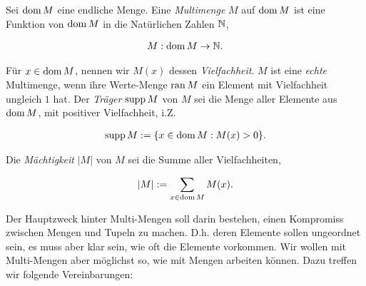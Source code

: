             \begin{definition}

                Sei $\operatorname{dom} M$ eine endliche Menge.
                Eine \textit{Multimenge} $M$ auf $\operatorname{dom} M$ ist eine Funktion von $\operatorname{dom} M$ in die Natürlichen Zahlen $\mathbb N$,

                \begin{align*}
                    M: \operatorname{dom} M \to \mathbb N.
                \end{align*}

                Für $x \in \operatorname{dom} M$, nennen wir $M(x)$ dessen \textit{Vielfachheit}.
                $M$ ist eine \textit{echte} Multimenge, wenn ihre Werte-Menge $\operatorname{ran} M$ ein Element mit Vielfachheit ungleich $1$ hat.
                Der \textit{Träger} $\operatorname{supp} M$ von $M$ sei die Menge aller Elemente aus $\operatorname{dom} M$, mit positiver Vielfachheit, i.Z.
                
                \begin{align*}
                    \operatorname{supp} M
                    :=
                    {\left \{ x \in \operatorname{dom} M: M(x) > 0 \right \}}.
                \end{align*}

                Die \textit{Mächtigkeit} $|M|$ von $M$ sei die Summe aller Vielfachheiten,

                \begin{align*}
                    |M| := \sum_{x \in \operatorname{dom} M} M(x).
                \end{align*}

            \end{definition}

            Der Hauptzweck hinter Multi-Mengen soll darin bestehen, einen Kompromiss zwischen Mengen und Tupeln zu machen.
            D.h. deren Elemente sollen ungeordnet sein, es muss aber klar sein, wie oft die Elemente vorkommen.
            Wir wollen mit Multi-Mengen aber möglichst so, wie mit Mengen arbeiten können.
            Dazu treffen wir folgende Vereinbarungen:

